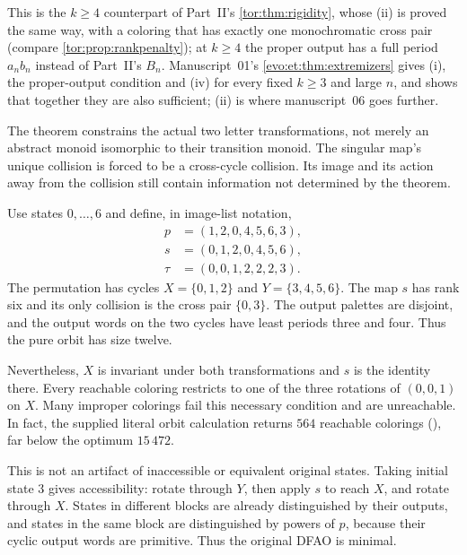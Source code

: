 \documentclass[11pt,a4paper]{article}
\numberwithin{equation}{section}
\theoremstyle{definition}
\theoremstyle{remark}
\begin{document}
This is the $k\ge4$ counterpart of Part~II's \cref{tor:thm:rigidity}, whose
(ii) is proved the same way, with a coloring that has exactly one
monochromatic cross pair (compare \cref{tor:prop:rankpenalty}); at $k\ge4$ the proper output has a full period
$a_nb_n$ instead of Part~II's $B_n$. Manuscript~01's
\cref{evo:et:thm:extremizers} gives (i), the proper-output condition and (iv)
for every fixed $k\ge3$ and large $n$, and shows that together they are also
sufficient; (ii) is where manuscript~06 goes further.

\begin{remark}[Manuscript~06]\label{evo:rem:rigidity}
The theorem constrains the actual two letter transformations, not merely an
abstract monoid isomorphic to their transition monoid. The singular map's
unique collision is forced to be a cross-cycle collision. Its image and its
action away from the collision still contain information not determined by
the theorem.
\end{remark}

\begin{example}\label{evo:ex:nonsaturation}
Use states $0,\ldots,6$ and define, in image-list notation,
\[
\begin{aligned}
p&=(1,2,0,4,5,6,3),\\
s&=(0,1,2,0,4,5,6),\\
\tau&=(0,0,1,2,2,2,3).
\end{aligned}
\]
The permutation has cycles $X=\{0,1,2\}$ and $Y=\{3,4,5,6\}$. The map $s$ has
rank six and its only collision is the cross pair $\{0,3\}$. The output
palettes are disjoint, and the output words on the two cycles have least
periods three and four. Thus the pure orbit has size twelve.

Nevertheless, $X$ is invariant under both transformations and $s$ is the
identity there. Every reachable coloring restricts to one of the three
rotations of $(0,0,1)$ on $X$. Many improper colorings fail this necessary
condition and are unreachable. In fact, the supplied literal orbit calculation
returns $564$ reachable colorings (),
far below the optimum $15\,472$.

This is not an artifact of inaccessible or equivalent original states. Taking
initial state $3$ gives accessibility: rotate through $Y$, then apply $s$ to
reach $X$, and rotate through $X$. States in different blocks are already
distinguished by their outputs, and states in the same block are
distinguished by powers of $p$, because their cyclic output words are
primitive. Thus the original DFAO is minimal.
\end{example}
\end{document}
